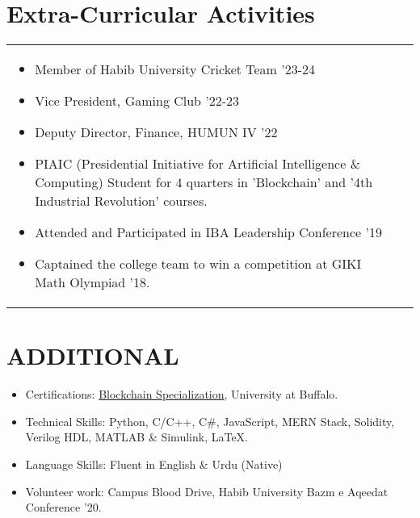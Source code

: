 \documentclass[a4paper,8pt]{article}
\begin{document}
\section{\textbf{Extra-Curricular Activities}}
\begin{tabularx}{\linewidth}{ @{}l r@{} }
\begin{minipage}[t]{\linewidth}
    \begin{itemize}[nosep,after=\strut, leftmargin=1em, itemsep=2pt]
        \item Member of Habib University Cricket Team '23-24
        \item Vice President, Gaming Club '22-23
        \item Deputy Director, Finance, HUMUN IV '22
        \item PIAIC (Presidential Initiative for Artificial Intelligence \& Computing) Student for 4 quarters in 'Blockchain' and '4th Industrial Revolution' courses. 
        \item Attended and Participated in IBA Leadership Conference '19
        \item Captained the college team to win a competition at GIKI Math Olympiad '18.
    \end{itemize}
\end{minipage}
\end{tabularx}

\section{\textbf{ADDITIONAL}}
\begin{minipage}[t]{\linewidth}
    \begin{itemize}[nosep,after=\strut, leftmargin=1em, itemsep=2pt]
        \item Certifications: \href{https://www.coursera.org/account/accomplishments/specialization/certificate/JFTPKQFGPQER}{Blockchain Specialization}, University at Buffalo.
        \item Technical Skills: Python, C/C++, C\#, JavaScript, MERN Stack, Solidity, Verilog HDL, MATLAB \& Simulink, LaTeX.
        \item Language Skills: Fluent in English \& Urdu (Native)
        \item Volunteer work: Campus Blood Drive, Habib University Bazm e Aqeedat Conference '20.
    \end{itemize}
\end{minipage}
\end{document}
